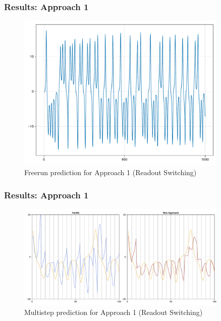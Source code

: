 \documentclass{beamer}
\begin{document}
\begin{frame}
    \frametitle{Results: Approach 1}

    \begin{figure}
        \centering
        \includegraphics[width=0.9\textwidth]{readout_switching_freerun.pdf}
        \caption{Freerun prediction for Approach 1 (Readout Switching)}
    \end{figure}
\end{frame}

\begin{frame}
    \frametitle{Results: Approach 1}

    \begin{figure}
        \centering
        \includegraphics[width=0.9\textwidth]{readout_switching_multistep.pdf}
        \caption{Multistep prediction for Approach 1 (Readout Switching)}
    \end{figure}
\end{frame}
\end{document}
